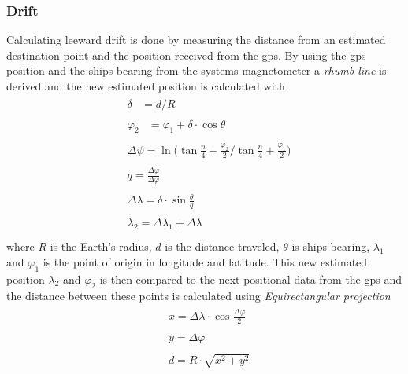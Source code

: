 \subsubsection{Drift}
Calculating leeward drift is done by measuring the distance from an estimated destination point and the position received from the \gls{gps}. By using the \gls{gps} position and the ships bearing from the systems magnetometer a \textit{rhumb line}\cite{rhumb-line} is derived and the new estimated position is calculated with
\begin{align*}
  &\begin{aligned}
  \delta &= d/R 
  \end{aligned}\\
 &\begin{aligned}
  \varphi_2 &= \varphi_1 + \delta \cdot \cos{\theta}
  \end{aligned}\\
 &\begin{aligned}
  \Delta\psi = \ln { \bigg( \tan{\frac{n}{4} + \frac{\varphi_2}{2}} \bigg/ \tan{\frac{n}{4} + \frac{\varphi_1}{2}} \bigg)}
  \end{aligned}\\
 &\begin{aligned}
  q = \frac{\Delta\varphi}{\Delta\varphi}
  \end{aligned}\\
 &\begin{aligned}
  \Delta\lambda = \delta\cdot\sin\frac{\theta}{q}
  \end{aligned}\\
 &\begin{aligned}
  \lambda_2 = \Delta\lambda_1 + \Delta\lambda
  \end{aligned}\\
\end{align*}
where $R$ is the Earth's radius, $d$ is the distance traveled, $\theta$ is ships bearing, $\lambda_1$ and $\varphi_1$ is the point of origin in longitude and latitude. This new estimated position $\lambda_2$ and $\varphi_2$ is then compared to the next positional data from the \gls{gps} and the distance between these points is calculated using \textit{Equirectangular projection}\cite{equirectangular}
\begin{align*}
  &\begin{aligned}
  x = \Delta\lambda \cdot \cos\frac{\Delta\varphi}{2}
  \end{aligned}\\
 &\begin{aligned}
  y = \Delta\varphi
  \end{aligned}\\
 &\begin{aligned}
  d = R\cdot\sqrt{x^2+y^2}
  \end{aligned}\\
\end{align*}
